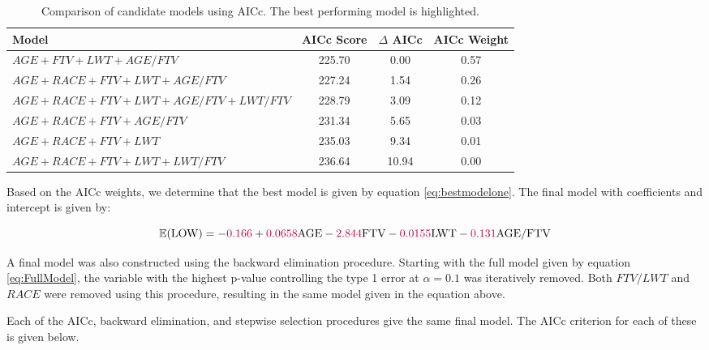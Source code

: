 \vspace{0.3cm}
\renewcommand\arraystretch{1.2}
\begin{table}[hbt!]
    \centering
    \begin{tabular}[t]{p{8cm}ccc}
        \toprule
        Model & AICc Score & $\Delta$ AICc & AICc Weight \\
        \midrule
        \rowcolor{blue!15}
        \small{$AGE+FTV+LWT+AGE/FTV$} & 225.70 & 0.00 & 0.57 \\
        \small{$AGE+RACE+FTV+LWT+AGE/FTV$} & 227.24 & 1.54 & 0.26 \\
        \small{$AGE+RACE+FTV+LWT+AGE/FTV+LWT/FTV$} & 228.79 & 3.09 & 0.12 \\
        \small{$AGE+RACE+FTV+AGE/FTV$} & 231.34 & 5.65 & 0.03 \\
        \small{$AGE+RACE+FTV+LWT$} & 235.03 & 9.34 & 0.01 \\
        \small{$AGE+RACE+FTV+LWT+LWT/FTV$} & 236.64 & 10.94 & 0.00 \\
        \bottomrule
    \end{tabular}
    \caption{Comparison of candidate models using AICc. The best performing model is highlighted.}
    \label{tab:ModelOneComparison}
\end{table}%

Based on the AICc weights, we determine that the best model is given by equation \ref{eq:bestmodelone}. The final model with coefficients and intercept is given by:

\begin{equation} \label{eq:finalmodel}
    \mathbb{E}(\text{LOW}) = -\textcolor{purple}{0.166} + \textcolor{purple}{0.0658}\text{AGE} - \textcolor{purple}{2.844}\text{FTV} -\textcolor{purple}{0.0155} \text{LWT} - \textcolor{purple}{0.131} \text{AGE/FTV}
\end{equation}

A final model was also constructed using the backward elimination procedure. Starting with the full model given by equation \ref{eq:FullModel}, the variable with the highest p-value controlling the type 1 error at $\alpha = 0.1$ was iteratively removed. Both $FTV/LWT$ and $RACE$ were removed using this procedure, resulting in the same model given in the equation above.

Each of the AICc, backward elimination, and stepwise selection procedures give the same final model. The AICc criterion for each of these is given below.

